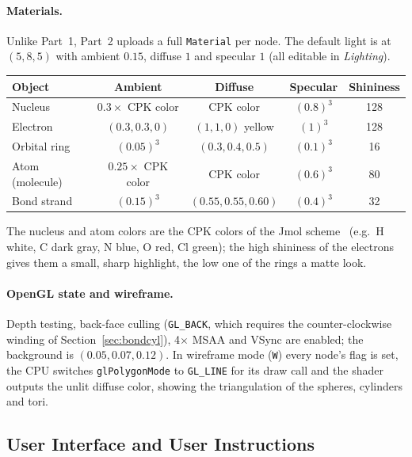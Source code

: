 \documentclass[a4paper, 11pt]{article}
\newcommand{\code}[1]{\texttt{#1}}
\begin{document}
\paragraph{Materials.} Unlike Part~1, Part~2 uploads a full \code{Material} per node. The default light is at $(5,8,5)$ with ambient $0.15$,
diffuse $1$ and specular $1$ (all editable in \emph{Lighting}).
\begin{center}
\small
\begin{tabular}{@{}l cccc@{}}
\toprule
\textbf{Object} & \textbf{Ambient} & \textbf{Diffuse} & \textbf{Specular} & \textbf{Shininess}\\
\midrule
Nucleus     & $0.3 \times$ CPK color & CPK color       & $(0.8)^3$ & 128\\
Electron    & $(0.3, 0.3, 0)$         & $(1, 1, 0)$ yellow & $(1)^3$ & 128\\
Orbital ring& $(0.05)^3$              & $(0.3, 0.4, 0.5)$ & $(0.1)^3$ & 16\\
Atom (molecule) & $0.25 \times$ CPK color & CPK color   & $(0.6)^3$ & 80\\
Bond strand & $(0.15)^3$              & $(0.55, 0.55, 0.60)$ & $(0.4)^3$ & 32\\
\bottomrule
\end{tabular}
\end{center}
The nucleus and atom colors are the CPK colors of the Jmol scheme~\cite{cpk} (e.g.\ H white, C dark gray, N blue, O red, Cl green); the high
shininess of the electrons gives them a small, sharp highlight, the low one of the rings a matte look.

\paragraph{OpenGL state and wireframe.} Depth testing, back-face culling (\code{GL\_BACK}, which requires the counter-clockwise winding of
Section~\ref{sec:bondcyl}), 4$\times$ MSAA and VSync are enabled; the background is $(0.05,0.07,0.12)$. In wireframe mode (\code{W}) every node's
flag is set, the CPU switches \code{glPolygonMode} to \code{GL\_LINE} for its draw call and the shader outputs the unlit diffuse color, showing the
triangulation of the spheres, cylinders and tori.

\subsection{User Interface and User Instructions}\label{sec:gui2}
\end{document}
